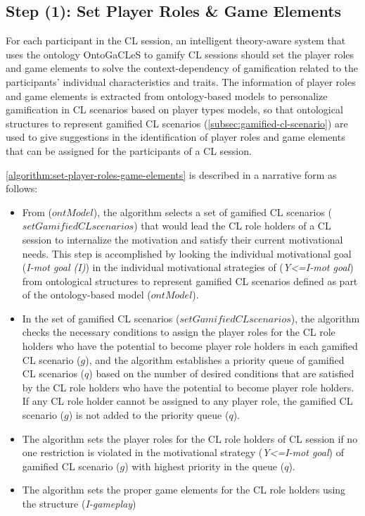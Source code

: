 \subsection*{Step (1): Set Player Roles \& Game Elements}

For each participant in the CL session, an intelligent theory-aware system that uses the ontology OntoGaCLeS to gamify CL sessions should set the player roles and game elements to solve the context-dependency of gamification related to the participants' individual characteristics and traits. The information of player roles and game elements is extracted from ontology-based models to personalize gamification in CL scenarios based on player types models, so that ontological structures to represent gamified CL scenarios (\autoref{subsec:gamified-cl-scenario}) are used to give suggestions in the identification of player roles and game elements that can be assigned for the participants of a CL session.

\autoref{algorithm:set-player-roles-game-elements} is described in a narrative form as follows:

\begin{itemize}
\item
From  ($ontModel$), the algorithm selects a set of gamified CL scenarios ($setGamifiedCLscenarios$) that would lead the CL role holders of a CL session to internalize the motivation and satisfy their current motivational needs. This step is accomplished by looking the individual motivational goal (\emph{I-mot goal (I)}) in the individual motivational strategies of (\emph{Y<=I-mot goal}) from ontological structures to represent gamified CL scenarios defined as part of the ontology-based model ($ontModel$).

\item
In the set of gamified CL scenarios ($setGamifiedCLscenarios$), the algorithm checks the necessary conditions to assign the player roles  for the CL role holders who have the potential to become player role holders in each gamified CL scenario ($g$), and the algorithm establishes a priority queue of gamified CL scenarios ($q$) based on the number of desired conditions that are satisfied by the CL role holders who have the potential to become player role holders. If any CL role holder cannot be assigned to any player role, the gamified CL scenario ($g$) is not added to the priority queue ($q$).

\item 
The algorithm sets the player roles for the CL role holders of CL session if no one restriction is violated in the motivational strategy (\emph{Y<=I-mot goal}) of gamified CL scenario ($g$) with highest priority in the queue ($q$).

\item
The algorithm sets the proper game elements for the CL role holders using the structure  (\emph{I-gameplay})
\end{itemize}


